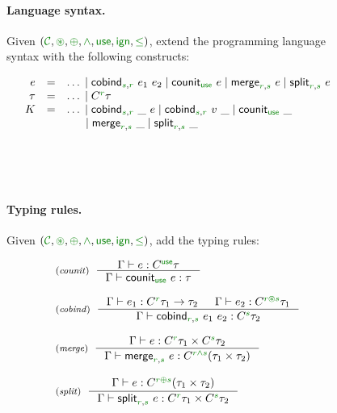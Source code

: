 
\begin{figure}[t]
\paragraph{Language syntax.}
Given $(\C, \cseq, \cpar, \czip, \cunit, \czero, \cleq)$, extend the programming language
syntax with the following constructs:

\begin{equation*}
\begin{array}{rcl}
  e &  =  &\ldots \sep\ident{cobind}_{\cclrd{s},\cclrd{r}}~e_1~e_2 \sep \ident{counit}_{\cunit}~e \sep \ident{merge}_{\cclrd{r},\cclrd{s}}~e
         \sep \ident{split}_{\cclrd{r},\cclrd{s}}~e \\
  \tau &  = &\ldots \sep \ctyp{\cclrd{r}}{\tau} \\
  K  & = &\ldots \sep \ident{cobind}_{\cclrd{s},\cclrd{r}}~\_~e \sep \ident{cobind}_{\cclrd{s},\cclrd{r}}~v~\_ \sep \ident{counit}_{\cunit}~\_ \\
    && \hspace{1.4em} \sep \ident{merge}_{\cclrd{r},\cclrd{s}}~\_
           \sep \ident{split}_{\cclrd{r},\cclrd{s}}~\_  \\
\end{array}
\end{equation*}

~

~

\paragraph{Typing rules.}
Given $(\C, \cseq, \cpar, \czip, \cunit, \czero, \cleq)$, add the typing rules:

\begin{equation*}
\begin{array}{l}
\tyrule{counit}
  {\Gamma \vdash e : \ctyp{\cunit}{\tau}}
  {\Gamma \vdash \ident{counit}_{\cunit}~e : \tau} \\
\\
\tyrule{cobind}
  {\Gamma \vdash e_1 : \ctyp{\cclrd{r}}{\tau_1} \rightarrow \tau_2 & \Gamma \vdash e_2 : \ctyp{\cclrd{r}\cseq\cclrd{s}}{\tau_1} }
  {\Gamma \vdash \ident{cobind}_{\cclrd{r}, \cclrd{s}}~e_1~e_2 : \ctyp{\cclrd{s}}{\tau_2}} \\
  \\
\tyrule{merge}
  {\Gamma \vdash  e : \ctyp{\cclrd{r}}{\tau_1} \times \ctyp{\cclrd{s}}{\tau_2} }
  {\Gamma \vdash  \ident{merge}_{\cclrd{r},\cclrd{s}}~e : \ctyp{\cclrd{r}\czip\cclrd{s}}{(\tau_1 \times \tau_2)} }\\
    \\
\tyrule{split}
  {\Gamma \vdash  e : \ctyp{\cclrd{r}\cpar\cclrd{s}}{(\tau_1 \times \tau_2)} }
  {\Gamma \vdash  \ident{split}_{\cclrd{r},\cclrd{s}}~e : \ctyp{\cclrd{r}}{\tau_1} \times \ctyp{\cclrd{s}}{\tau_2}} \\
\end{array}
\end{equation*}


\end{figure}
